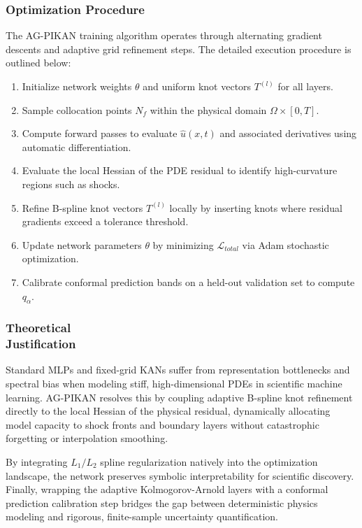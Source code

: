 \documentclass[10pt,twocolumn]{article}
\begin{document}
\subsubsection{Optimization Procedure}

The AG-PIKAN training 
algorithm operates through 
alternating gradient 
descents and adaptive 
grid refinement steps.
The detailed execution 
procedure is outlined 
below:

\begin{enumerate}
\item Initialize network 
weights $\theta$ and 
uniform knot vectors 
$T^{(l)}$ for all layers.
\item Sample collocation 
points $N_f$ within 
the physical domain 
$\Omega \times [0,T]$.
\item Compute forward 
passes to evaluate 
$\hat{u}(x,t)$ and 
associated derivatives 
using automatic 
differentiation.
\item Evaluate the local 
Hessian of the PDE 
residual to identify 
high-curvature regions 
such as shocks.
\item Refine B-spline 
knot vectors $T^{(l)}$ 
locally by inserting 
knots where residual 
gradients exceed a 
tolerance threshold.
\item Update network 
parameters $\theta$ by 
minimizing 
$\mathcal{L}_{total}$ 
via Adam stochastic 
optimization.
\item Calibrate conformal 
prediction bands on a 
held-out validation 
set to compute 
$q_\alpha$.
\end{enumerate}

\subsubsection{Theoretical \\ Justification}

Standard MLPs and 
fixed-grid KANs 
suffer from representation 
bottlenecks and spectral 
bias when modeling 
stiff, high-dimensional 
PDEs in scientific 
machine learning. 
AG-PIKAN resolves this 
by coupling adaptive 
B-spline knot refinement 
directly to the local 
Hessian of the physical 
residual, dynamically 
allocating model 
capacity to shock 
fronts and boundary 
layers without 
catastrophic forgetting 
or interpolation 
smoothing. 

By integrating 
$L_1/L_2$ spline 
regularization natively 
into the optimization 
landscape, the network 
preserves symbolic 
interpretability for 
scientific discovery. 
Finally, wrapping the 
adaptive Kolmogorov-Arnold 
layers with a conformal 
prediction calibration 
step bridges the gap 
between deterministic 
physics modeling and 
rigorous, finite-sample 
uncertainty quantification.
\end{document}
